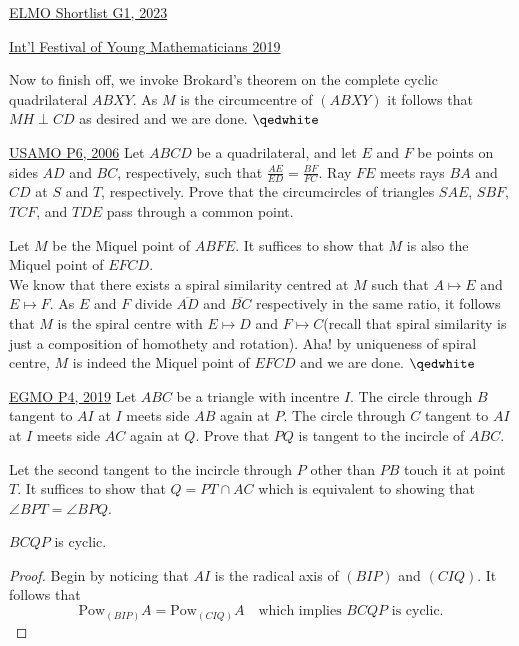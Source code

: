 \begin{problem}{14}{\href{https://artofproblemsolving.com/community/c6h3100572p28033718}{ELMO Shortlist G1, 2023}}
\begin{problem}{4}{\href{https://artofproblemsolving.com/community/q2h1920217p35604706}{Int'l Festival of Young Mathematicians 2019}}
\begin{solution}
	Now to finish off, we invoke Brokard's theorem on the complete cyclic quadrilateral $ABXY$. As $M$ is the circumcentre of $(ABXY)$ it follows that $MH\perp CD$ as desired and we are done. $\qedwhite$
	\end{solution}
	\end{problem}
	
\begin{problem}{5}{\href{https://artofproblemsolving.com/community/q2h84559p35507946}{USAMO P6, 2006}} 
	Let $ABCD$ be a quadrilateral, and let $E$ and $F$ be points on sides $AD$ and $BC$, respectively, such that $\frac{AE}{ED} = \frac{BF}{FC}$. Ray $FE$ meets rays $BA$ and $CD$ at $S$ and $T$, respectively. Prove that the circumcircles of triangles $SAE$, $SBF$, $TCF$, and $TDE$ pass through a common point.
	\begin{solution} Let $M$ be the Miquel point of $ABFE$. It suffices to show that $M$ is also the Miquel point of $EFCD$.\\
We know that there exists a spiral similarity centred at $M$ such that $A\mapsto E$ and $E\mapsto F$. As $E$ and $F$ divide $\overline{AD}$ and $\overline{BC}$ respectively in the same ratio, it follows that $M$ is the spiral centre with $E\mapsto D$ and $F\mapsto C$(recall that spiral similarity is just a composition of homothety and rotation). Aha! by uniqueness of spiral centre, $M$ is indeed the Miquel point of $EFCD$ and we are done. $\qedwhite$
	\end{solution}
\end{problem}

\begin{problem}{6}{\href{https://artofproblemsolving.com/community/q2h1819300p35507923}{EGMO P4, 2019}} 
	Let $ABC$ be a triangle with incentre $I$. The circle through $B$ tangent to $AI$ at $I$ meets side $AB$ again at $P$. The circle through $C$ tangent to $AI$ at $I$ meets side $AC$ again at $Q$. Prove that $PQ$ is tangent to the incircle of $ABC$.
	\begin{solution} Let the second tangent to the incircle through $P$ other than $PB$ touch it at point $T$. It suffices to show that $Q=PT\cap AC$ which is equivalent to showing that $\angle BPT=\angle BPQ$.
	
	\begin{numclaim}{1} $BCQP$ is cyclic.
	\end{numclaim}
	
	\begin{proof} Begin by noticing that $AI$ is the radical axis of $(BIP)$ and $(CIQ)$. It follows that
$$\text{Pow}_{(BIP)}A=\text{Pow}_{(CIQ)}A\quad\text{which implies $BCQP$ is cyclic.}$$
	\end{proof}
	

\end{solution}
\end{problem}
\end{problem}
